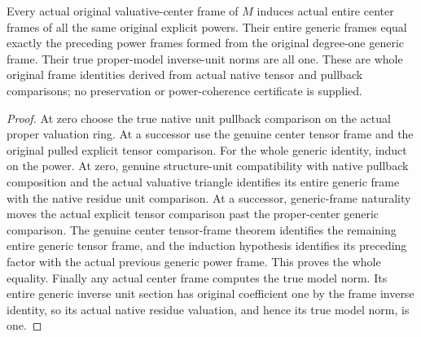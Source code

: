 \begin{theorem}\label{thm:fc-proper-center-power-frame-coherence}
\leanok
{}
Every actual original valuative-center frame of $M$ induces actual
entire center frames of all the same original explicit powers.
Their entire generic frames equal exactly the preceding power
frames formed from the original degree-one generic frame. Their
true proper-model inverse-unit norms are all one. These are
whole original frame identities derived from actual native tensor
and pullback comparisons; no preservation or power-coherence
certificate is supplied.
\end{theorem}
\begin{proof}
At zero choose the true native unit pullback comparison on the
actual proper valuation ring. At a successor use the genuine
center tensor frame and the original pulled explicit tensor
comparison. For the whole generic identity, induct on the power.
At zero, genuine structure-unit compatibility with native pullback
composition and the actual valuative triangle identifies its
entire generic frame with the native residue unit comparison.
At a successor, generic-frame naturality moves the actual
explicit tensor comparison past the proper-center generic
comparison. The genuine center tensor-frame theorem identifies
the remaining entire generic tensor frame, and the induction
hypothesis identifies its preceding factor with the actual
previous generic power frame. This proves the whole equality.
Finally any actual center frame computes the true model norm.
Its entire generic inverse unit section has original coefficient
one by the frame inverse identity, so its actual native residue
valuation, and hence its true model norm, is one.
\end{proof}
